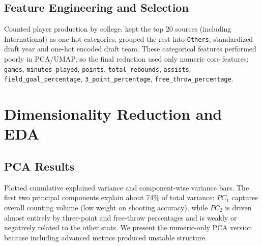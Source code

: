 \documentclass[12pt]{article}
\begin{document}
\subsection{Feature Engineering and Selection}
Counted player production by college, kept the top 20 sources (including International) as one-hot categories, grouped the rest into \texttt{Others}; standardized draft year and one-hot encoded draft team. These categorical features performed poorly in PCA/UMAP, so the final reduction used only numeric core features: \texttt{games}, \texttt{minutes\_played}, \texttt{points}, \texttt{total\_rebounds}, \texttt{assists}, \texttt{field\_goal\_percentage}, \texttt{3\_point\_percentage}, \texttt{free\_throw\_percentage}.

\section{Dimensionality Reduction and EDA}
\subsection{PCA Results}
Plotted cumulative explained variance and component-wise variance bars. The first two principal components explain about 74\% of total variance: $PC_1$ captures overall counting volume (low weight on shooting accuracy), while $PC_2$ is driven almost entirely by three-point and free-throw percentages and is weakly or negatively related to the other stats. We present the numeric-only PCA version because including advanced metrics produced unstable structure.
\end{document}
